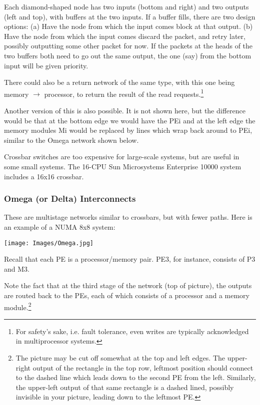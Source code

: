 Each diamond-shaped node has two inputs (bottom and right) and two
outputs (left and top), with buffers at the two inputs.  If a buffer
fills, there are two design options: (a) Have the node from which the
input comes block at that output. (b) Have the node from which the input
comes discard the packet, and retry later, possibly outputting some
other packet for now.  If the packets at the heads of the two buffers
both need to go out the same output, the one (say) from the bottom input
will be given priority.

There could also be a return network of the same type, with this one
being memory \( \rightarrow  \) processor, to return the result of the
read requests.\footnote{For safety's sake, i.e. fault tolerance, even
writes are typically acknowledged in multiprocessor systems.}

Another version of this is also possible. It is not shown here, but the
difference would be that at the bottom edge we would have the PEi and at
the left edge the memory modules Mi would be replaced by lines which
wrap back around to PEi, similar to the Omega network shown below.

Crossbar switches are too expensive for large-scale systems, but are
useful in some small systems. The 16-CPU Sun Microsystems Enterprise
10000 system includes a 16x16 crossbar.

\subsubsection{Omega (or Delta) Interconnects}

These are multistage networks similar to crossbars, but with fewer
paths. Here is an example of a NUMA 8x8 system:

\par

\centerline{
\texttt{[image: Images/Omega.jpg]}
}

Recall that each PE is a processor/memory pair.  PE3, for instance,
consists of P3 and M3.

Note the fact that at the third stage of the network (top of picture),
the outputs are routed back to the PEs, each of which consists of a
processor and a memory module.\footnote{The picture may be cut off somewhat
at the top and left edges.  The upper-right output of the rectangle in
the top row, leftmost position should connect to the dashed line which
leads down to the second PE from the left.  Similarly, the upper-left
output of that same rectangle is a dashed lined, possibly invisible in
your picture, leading down to the leftmost PE.}

